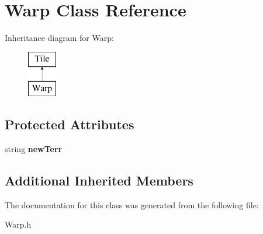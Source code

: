\hypertarget{class_warp}{}\section{Warp Class Reference}
\label{class_warp}
Inheritance diagram for Warp\+:\begin{figure}[H]
\begin{center}
\leavevmode
\includegraphics[height=2.000000cm]{class_warp}
\end{center}
\end{figure}
\subsection*{Protected Attributes}
\begin{DoxyCompactItemize}
\item 
string {\bfseries new\+Terr}\hypertarget{class_warp_abbc0edf4c6a9939e0c39c9eb55b8fb1f}{}\label{class_warp_abbc0edf4c6a9939e0c39c9eb55b8fb1f}

\end{DoxyCompactItemize}
\subsection*{Additional Inherited Members}


The documentation for this class was generated from the following file\+:\begin{DoxyCompactItemize}
\item 
Warp.\+h\end{DoxyCompactItemize}
